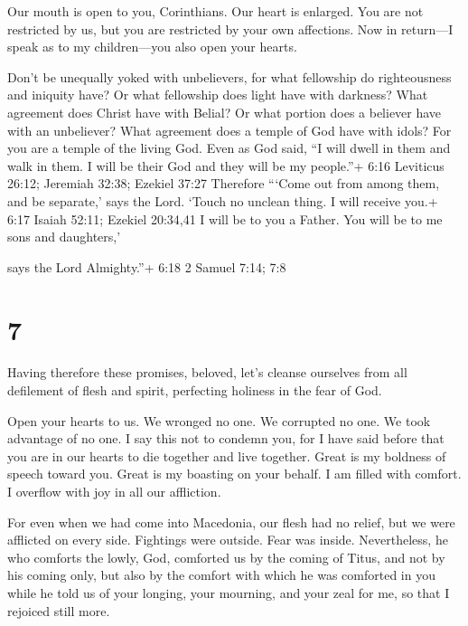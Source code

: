  Our mouth is open to you, Corinthians. Our heart is
enlarged.  You are not restricted by us, but you are
restricted by your own affections.  Now in return---I speak
as to my children---you also open your hearts.

 Don't be unequally yoked with unbelievers, for what
fellowship do righteousness and iniquity have? Or what fellowship does
light have with darkness?  What agreement does Christ have
with Belial? Or what portion does a believer have with an unbeliever?
 What agreement does a temple of God have with idols? For
you are a temple of the living God. Even as God said, ``I will dwell in
them and walk in them. I will be their God and they will be my
people.''+ 6:16 Leviticus 26:12; Jeremiah 32:38; Ezekiel 37:27
 Therefore ```Come out from among them, and be separate,'
says the Lord. `Touch no unclean thing. I will receive you.+ 6:17 Isaiah
52:11; Ezekiel 20:34,41  I will be to you a Father. You
will be to me sons and daughters,'

says the Lord Almighty.''+ 6:18 2 Samuel 7:14; 7:8

\hypertarget{section-6}{%
\section{7}\label{section-6}}

 Having therefore these promises, beloved, let's cleanse
ourselves from all defilement of flesh and spirit, perfecting holiness
in the fear of God.

 Open your hearts to us. We wronged no one. We corrupted no
one. We took advantage of no one.  I say this not to condemn
you, for I have said before that you are in our hearts to die together
and live together.  Great is my boldness of speech toward
you. Great is my boasting on your behalf. I am filled with comfort. I
overflow with joy in all our affliction.

 For even when we had come into Macedonia, our flesh had no
relief, but we were afflicted on every side. Fightings were outside.
Fear was inside.  Nevertheless, he who comforts the lowly,
God, comforted us by the coming of Titus,  and not by his
coming only, but also by the comfort with which he was comforted in you
while he told us of your longing, your mourning, and your zeal for me,
so that I rejoiced still more.

